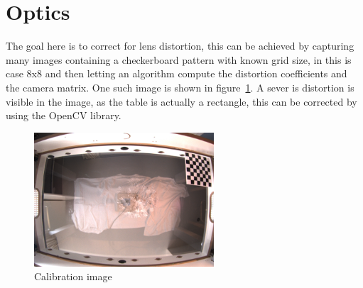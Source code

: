 \section{Optics}\label{sec:optics}
The goal here is to correct for lens distortion, this can be achieved by capturing many images containing a checkerboard pattern with known grid size, in this is case 8x8 and then letting an algorithm compute the distortion coefficients and the camera matrix.
One such image is shown in figure~\ref{fig:calibration_image}.
A sever is distortion is visible in the image, as the table is actually a rectangle, this can be corrected by using the OpenCV library.
\begin{figure}[H]
    \centering
    \includegraphics[height=5cm]{../photos/calibration_image}
    \caption[calimage]{Calibration image}
    \label{fig:calibration_image}
\end{figure}


